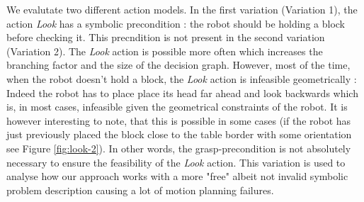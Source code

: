 \documentclass[conference]{IEEEtran}
\begin{document}
We evalutate two different action models. In the first variation (Variation 1), the action \textit{Look} has a symbolic precondition : the robot should be holding a block before checking it. This precndition is not present in the second variation (Variation 2). The \textit{Look} action is possible more often which increases the branching factor and the size of the decision graph. However, most of the time, when the robot doesn't hold a block, the \textit{Look} action is infeasible geometrically : Indeed the robot has to place place its head far ahead and look backwards which is, in most cases, infeasible given the geometrical constraints of the robot. It is however interesting to note, that this is possible in some cases (if the robot has just previously placed the block close to the table border with some orientation see Figure \ref{fig:look-2}). In other words, the grasp-precondition is not absolutely necessary to ensure the feasibility of the \textit{Look} action. This variation is used to analyse how our approach works with a more "free" albeit not invalid symbolic problem description causing a lot of motion planning failures.
\end{document}
